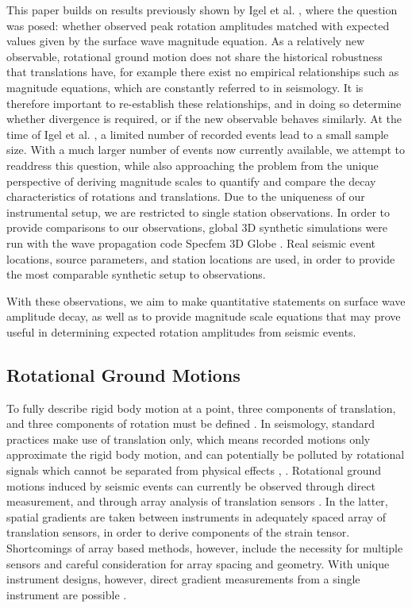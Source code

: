 \documentclass{gji}
\begin{document}
This paper builds on results previously shown by Igel et al. , 
where the question was posed: whether observed peak rotation amplitudes matched with expected values given by the surface wave magnitude equation. 
As a relatively new observable, rotational ground motion does not share the historical robustness that translations have, for example there exist no empirical relationships such as magnitude equations, which are constantly referred to in seismology. It is therefore important to re-establish these relationships, and in doing so determine whether divergence is required, or if the new observable behaves similarly.
At the time of Igel et al. , a limited number of recorded events lead to a small sample size. With a much larger number of events now currently available, we attempt to readdress this question, while also approaching the problem from the unique perspective of deriving magnitude scales to quantify and compare the decay characteristics of rotations and translations. Due to the uniqueness of our instrumental setup, we are restricted to single station observations. In order to provide comparisons to our observations, global 3D synthetic simulations were run with the wave propagation code Specfem 3D Globe \cite{komatitsch2002spectrala} \cite{komatitsch2002spectralb}. Real seismic event locations, source parameters, and station locations are used, in order to provide the most comparable synthetic setup to observations. 

With these observations, we aim to make quantitative statements on surface wave amplitude decay, as well as to provide magnitude scale equations that may prove useful in determining expected rotation amplitudes from seismic events.

\subsection{Rotational Ground Motions}
To fully describe rigid body motion at a point, three components of translation, and three components of rotation must be defined \cite{stein2009introduction}. In seismology, standard practices make use of translation only, which means recorded motions only approximate the rigid body motion, and can potentially be polluted by rotational signals which cannot be separated from physical effects \cite{igel2005rotational}, \cite{aki2002quantitative}.  Rotational ground motions induced by seismic events can currently be observed through direct measurement, and through array analysis of translation sensors \cite{spudich1995transient}.
In the latter, spatial gradients are taken between instruments in adequately spaced array of translation sensors, in order to derive components of the strain tensor. Shortcomings of array based methods, however, include the necessity for multiple sensors and careful consideration for array spacing and geometry. With unique instrument designs, however, direct gradient measurements from a single instrument are  possible \cite{schreiber2006ring}. %
\end{document}
